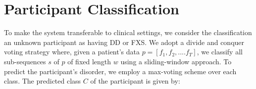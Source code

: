 \documentclass[10pt,twocolumn,letterpaper]{article}
\begin{document}






\section{Participant Classification}
\label{sec:participant_classification}
To make the system transferable to clinical settings, we consider the classification an unknown participant as having DD or FXS. We adopt a divide and conquer voting strategy where, given a patient's data $p=[f_1, f_2,....f_{T}]$, we classify all sub-sequences $s$ of $p$ of fixed length $w$ using a sliding-window approach. To predict the participant's disorder, we employ a max-voting scheme over each class. The predicted class $C$ of the participant is given by:
\end{document}
